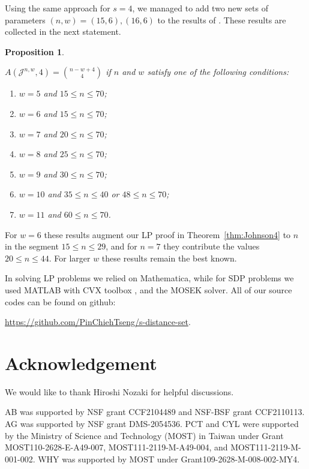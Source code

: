\documentclass{amsart}
\newtheorem{propositionenv}[definitionenv]{Proposition}
\newenvironment{proposition}{\begin{propositionenv}\rm}{\end{propositionenv}}
\newcommand{\cJ}{\mathcal{J}}
\begin{document}
Using the same approach for $s=4$, we managed to add two new sets of parameters $(n, w) = (15, 6), (16, 6)$ to the results of \cite{MN11}. These results are collected in the next statement.
\begin{proposition} 
\label{prop:4_dis_equal_J}
{$A(\cJ^{n, w}, 4) = \binom{n-w+4}{4}$ if $n$ and $w$ satisfy one of the following conditions:
\begin{enumerate}
  \item $w=5$ and $15\le n\le 70$;
  \item $w=6$ and $15\le n\le70$;
  \item $w=7$ and $20\le n\le 70$;
  \item $w=8$ and $25\le n\le 70$;
  \item $w=9$ and $30\le n\le 70$;
  \item $w=10$ and $35\le n\le 40$ or $48\le n\le 70$;
  \item $w=11$ and $60\le n\le 70$.
\end{enumerate}}
\end{proposition}
For $w=6$ these results augment our LP proof in Theorem~\ref{thm:Johnson4} to 
$n$ in the segment $15\le n\le 29$, and for $n=7$ they contribute the values $20\le n\le 44.$ For larger $w$ these results remain the best known.

In solving LP problems we relied on Mathematica, while for SDP problems we
used MATLAB with CVX toolbox \cite{GB08},\cite{GB14} and the MOSEK solver. All of our source codes can be found on github:
\begin{center}
    \url{https://github.com/PinChiehTseng/s-distance-set}.
\end{center}

\section*{Acknowledgement}
We would like to thank Hiroshi Nozaki for helpful discussions.

AB was supported by NSF grant CCF2104489 and NSF-BSF grant CCF2110113. AG was supported by NSF grant DMS-2054536. PCT and CYL were supported by the Ministry of Science and Technology (MOST) in Taiwan under Grant MOST110-2628-E-A49-007, MOST111-2119-M-A49-004, and MOST111-2119-M-001-002. WHY was supported by MOST under Grant109-2628-M-008-002-MY4.



%
%

\end{document}
